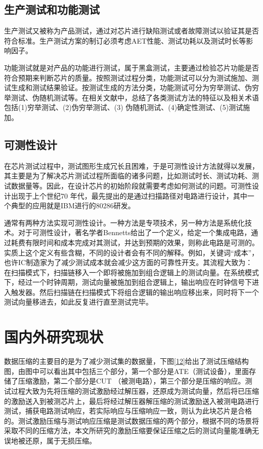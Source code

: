 \subsection{生产测试和功能测试}
生产测试又被称为产品测试，通过对芯片进行缺陷测试或者故障测试以验证其是否符合标准。生产测试方案的制订必须考虑AET性能、测试功耗以及测试时长等影响因子。

功能测试就是对产品的功能进行测试，属于黑盒测试，主要通过检验芯片功能是否符合预期来判断芯片的质量。按照测试过程分类，功能测试可以分为测试施加、测试生成和测试结果验证。按测试生成的方法分类，功能测试可分为穷举测试、伪穷举测试、伪随机测试等。在相关文献\cite{19}中，总结了各类测试方法的特征以及相关术语包括(1)穷举测试、(2)伪穷举测试\cite{20}、(3) 伪随机测试\cite{21}、(4)确定性测试、(5)测试施加\cite{22,23}。

\subsection{可测性设计}

在芯片测试过程中，测试图形生成冗长且困难，于是可测性设计方法就得以发展，其主要是为了解决芯片测试过程所面临的诸多问题，比如测试时长、测试功耗、测试数据量等。因此，在设计芯片的初始阶段就需要考虑如何测试的问题。可测性设计出现于上个世纪70 年代，最先提出的是通过扫描路径\cite{24}对电路进行设计，其中一个典型的应用就是IBM进行的80286研发\cite{25}。

通常有两种方法实现可测性设计。一种方法是专项技术，另一种方法是系统化技术。对于可测性设计，著名学者Bennetts给出了一个定义，给定一个集成电路，通过耗费有限时间和成本完成对其测试，并达到预期的效果，则称此电路是可测的\cite{26}。 实质上这个定义有些含糊，不同的设计者会有不同的解释。例如，关键词“成本”，也许IC制造家为了减少测试成本就会减少这方面的可靠性开支。其流程大致为：在扫描模式下，扫描链移入一个即将被施加到组合逻辑上的测试向量。在系统模式下，经过一个时钟周期，测试向量被施加到组合逻辑上，输出响应在时钟信号下进入触发器。然后扫描链在扫描模式下将组合逻辑的输出响应移出来，同时将下一个测试向量移进去，如此反复进行直至测试完毕。

\section{国内外研究现状}

数据压缩的主要目的是为了减少测试集的数据量，下图\ref{12}给出了测试压缩结构图，由图中可以看出其中包括三个部分，第一个部分是ATE（测试设备），里面存储了压缩激励，第二个部分是CUT （被测电路），第三个部分是压缩的响应。测试过程大致为先将压缩的测试激励经过解压器，还原成为测试向量，然后将已压缩的激励送入到被测芯片上，最后将经过解压器解压缩的测试激励送入被测电路进行测试，捕获电路测试响应，若实际响应与压缩响应一致，则认为此块芯片是合格的。测试激励压缩与测试响应压缩是测试数据压缩的两个部分，根据不同的场景将采取不同的压缩方法，本文所研究的激励压缩要保证压缩之后的测试向量能准确无误地被还原，属于无损压缩。

